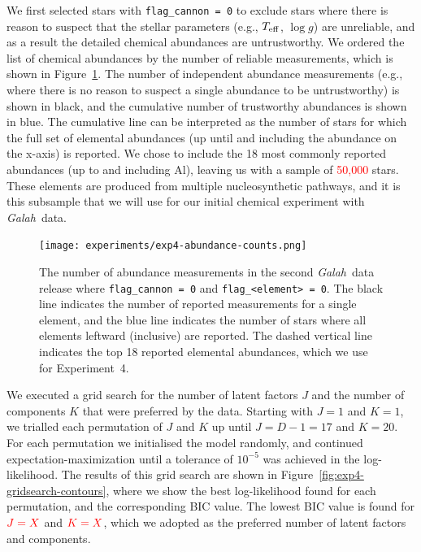 \documentclass[twocolumn]{aastex62}
\newcommand\teff{T_{\rm eff}}
\newcommand\logg{\log{g}}
\newcommand{\project}[1]{\textsl{#1}}
\newcommand{\Galah}{\project{Galah}}
\newcommand{\todo}[1]{\textcolor{red}{#1}}
\newcommand{\NumDimensions}{D}
\newcommand{\NumLatentFactors}{J}
\newcommand{\NumComponents}{K}
\begin{document}
We first selected stars with \texttt{flag\_cannon = 0} to exclude
stars where there is reason to suspect that the stellar parameters
(e.g., $\teff$, $\logg$) are unreliable, and as a result the 
detailed chemical abundances are untrustworthy. We ordered the
list of chemical abundances by the number of reliable measurements,
which is shown in Figure~\ref{fig:exp4-abundance-counts}. The number of
independent abundance measurements (e.g., where there is no reason
to suspect a single abundance to be untrustworthy) is shown in black,
and the cumulative number of trustworthy abundances is shown in blue.
The cumulative line can be interpreted as the number of stars for
which the full set of elemental abundances (up until and including
the abundance on the x-axis) is reported. We chose to include the
18 most commonly reported abundances (up to and including Al),
leaving us with a sample of \todo{50,000} stars.
These elements are produced from multiple nucleosynthetic
pathways, and it is this subsample that we will use for 
our initial chemical experiment with \Galah\ data.



\begin{figure}
	\texttt{[image: experiments/exp4-abundance-counts.png]}
	\caption{The number of abundance measurements in the second
		     \Galah\ data release \citep{Buder:2018} where \texttt{flag\_cannon = 0}
		     and \texttt{flag\_<element> = 0}. The black line indicates the number
		     of reported measurements for a single element, and the blue line
		     indicates the number of stars where all elements leftward (inclusive)
		     are reported. The dashed vertical line indicates the top 18 reported
		     elemental abundances, which we use for Experiment~4.}
    \label{fig:exp4-abundance-counts} 
\end{figure}


We executed a grid search for the number of latent factors $\NumLatentFactors$
and the number of components $\NumComponents$ that were preferred by the data.
Starting with $\NumLatentFactors = 1$ and $\NumComponents = 1$, we trialled each
permutation of $\NumLatentFactors$ and $\NumComponents$ up until $\NumLatentFactors = \NumDimensions - 1 = 17$
and $\NumComponents = 20$. For each permutation we initialised the model randomly,
and continued expectation-maximization until a tolerance of $10^{-5}$ was achieved
in the log-likelihood. The results of this grid search are shown in Figure~\ref{fig:exp4-gridsearch-contours},
where we show the best log-likelihood found for each permutation, and the corresponding
BIC value. The lowest BIC value is found for $\todo{\NumLatentFactors = X}$ and
$\todo{\NumComponents = X}$, which we adopted as the preferred number of latent
factors and components.
\end{document}
